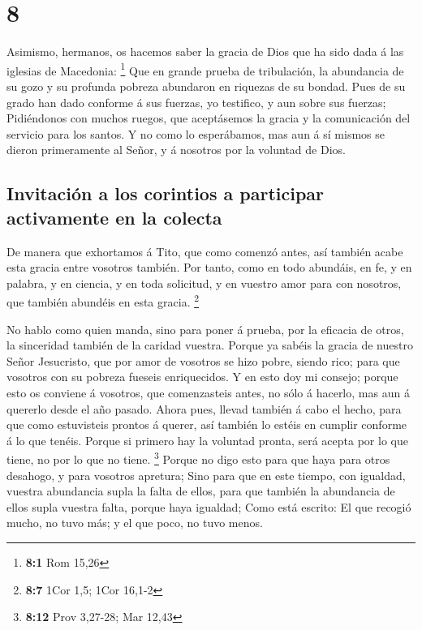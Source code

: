 \hypertarget{section-7}{%
\section{8}\label{section-7}}

 Asimismo, hermanos, os hacemos saber la gracia de Dios que
ha sido dada á las iglesias de Macedonia: \footnote{\textbf{8:1} Rom
  15,26}  Que en grande prueba de tribulación, la abundancia
de su gozo y su profunda pobreza abundaron en riquezas de su bondad.
 Pues de su grado han dado conforme á sus fuerzas, yo
testifico, y aun sobre sus fuerzas;  Pidiéndonos con muchos
ruegos, que aceptásemos la gracia y la comunicación del servicio para
los santos.  Y no como lo esperábamos, mas aun á sí mismos
se dieron primeramente al Señor, y á nosotros por la voluntad de Dios.

\hypertarget{invitaciuxf3n-a-los-corintios-a-participar-activamente-en-la-colecta}{%
\subsection{Invitación a los corintios a participar activamente en la
colecta}\label{invitaciuxf3n-a-los-corintios-a-participar-activamente-en-la-colecta}}

 De manera que exhortamos á Tito, que como comenzó antes,
así también acabe esta gracia entre vosotros también.  Por
tanto, como en todo abundáis, en fe, y en palabra, y en ciencia, y en
toda solicitud, y en vuestro amor para con nosotros, que también
abundéis en esta gracia. \footnote{\textbf{8:7} 1Cor 1,5; 1Cor 16,1-2}

 No hablo como quien manda, sino para poner á prueba, por la
eficacia de otros, la sinceridad también de la caridad vuestra.
 Porque ya sabéis la gracia de nuestro Señor Jesucristo, que
por amor de vosotros se hizo pobre, siendo rico; para que vosotros con
su pobreza fueseis enriquecidos.  Y en esto doy mi consejo;
porque esto os conviene á vosotros, que comenzasteis antes, no sólo á
hacerlo, mas aun á quererlo desde el año pasado.  Ahora
pues, llevad también á cabo el hecho, para que como estuvisteis prontos
á querer, así también lo estéis en cumplir conforme á lo que tenéis.
 Porque si primero hay la voluntad pronta, será acepta por
lo que tiene, no por lo que no tiene. \footnote{\textbf{8:12} Prov
  3,27-28; Mar 12,43}  Porque no digo esto para que haya
para otros desahogo, y para vosotros apretura;  Sino para
que en este tiempo, con igualdad, vuestra abundancia supla la falta de
ellos, para que también la abundancia de ellos supla vuestra falta,
porque haya igualdad;  Como está escrito: El que recogió
mucho, no tuvo más; y el que poco, no tuvo menos.

